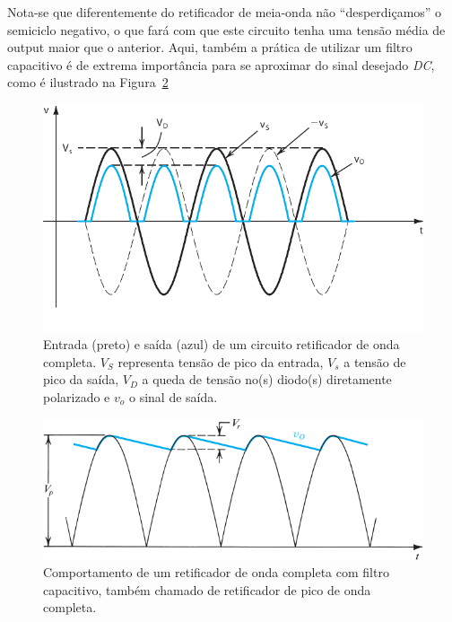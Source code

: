 \documentclass[12pt,a4paper]{article}
\begin{document}
Nota-se que diferentemente do retificador de meia-onda não ``desperdiçamos'' o semiciclo negativo, o que fará com que este circuito tenha uma tensão média de output maior que o anterior. Aqui, também a prática de utilizar um filtro capacitivo é de extrema importância para se aproximar do sinal desejado \emph{DC}, como é ilustrado na Figura~\ref{fig:ondacompletacapacitor}
\begin{figure}[htpb]
  \centering
  \includegraphics[width=0.8\linewidth]{./ondacompleta.pdf}
  \caption{Entrada (preto) e saída (azul) de um circuito retificador de onda completa. $V_S$ representa tensão de pico da entrada, $V_s$ a tensão de pico da saída, $V_D$ a queda de tensão no(s) diodo(s) diretamente polarizado e $v_o$ o sinal de saída.}
  \label{fig:ondacompleta}
\end{figure}

\begin{figure}[htpb]
  \centering
  \includegraphics[width=0.8\linewidth]{./ondacompletacapacitor.pdf}
  \caption{Comportamento de um retificador de onda completa com filtro capacitivo, também chamado de retificador de pico de onda completa.}
  \label{fig:ondacompletacapacitor}
\end{figure}
\newpage
\end{document}
